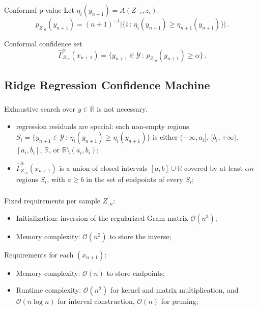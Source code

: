\documentclass[t]{beamer}  %
\newcommand{\Ycal}{\mathcal{Y}}
\newcommand{\Ocal}{\mathcal{O}}
\newcommand{\Real}{\mathbb{R}}
\begin{document}
\begin{frame}[t]\frametitle{\insertsection}
  \begin{block}{Conformal p-value}
    Let $\eta_i(y_{n+1}) = A(Z_{-i}, z_i)$.
    $$ p_{Z_{:n}}(y_{n+1})
          = (n+1)^{-1} \bigl\lvert\{ i \,:\, \eta_i(y_{n+1}) \geq \eta_{n+1}(y_{n+1}) \}\bigr\rvert
      \,. $$
  \end{block}

  \begin{block}{Conformal confidence set}
    $$ \hat{\Gamma}_{Z_{:n}}^\alpha(x_{n+1})
        = \bigl\{ y_{n+1}\in \Ycal \,:\, p_{Z_{:n}}(y_{n+1}) \geq \alpha \bigr\}
      \,. $$
  \end{block}
\end{frame}

\subsection{Ridge Regression Confidence Machine} %
\label{sub:ridge_regression_confidence_machine}

\begin{frame}[t]\frametitle{\insertsection}
  \framesubtitle{\insertsubsection}
  \begin{block}{Exhaustive search over $y\in \Real$ is not necessary.}
    \begin{itemize}
      \item regression residuals are special: each non-empty regions
      $S_i = \{y_{n+1}\in \Ycal \,:\, \eta_i(y_{n+1}) \geq \eta_i(y_{n+1})\}$
      is either $(-\infty, a_i]$, $[b_i, +\infty)$, $[a_i, b_i]$, $\Real$, or
      $\Real\setminus (a_i, b_i)$;
      \item $\hat{\Gamma}_{Z_{:n}}^\alpha(x_{n+1})$ is a union of closed intervals
        $[a, b]\cup\Real$ covered by at least $\alpha n$ regions $S_i$, with
        $a\geq b$ in the set of endpoints of every $S_i$;
    \end{itemize}
  \end{block}
\end{frame}

\begin{frame}[c]\frametitle{\insertsection}
\framesubtitle{\insertsubsection}
  Fixed requirements per sample $Z_{:n}$: \begin{itemize}
    \item Initialization: inversion of the regularized Gram matrix $\Ocal(n^3)$;
    \item Memory complexity: $\Ocal(n^2)$ to store the inverse;
  \end{itemize}

  Requirements for each $(x_{n+1})$:
  \begin{itemize}
    \item Memory complexity: $\Ocal(n)$ to store endpoints;
    \item Runtime complexity: $\Ocal(n^2)$ for kernel and matrix multiplication,
    and $\Ocal(n \log n)$ for interval construction, $\Ocal(n)$ for pruning;
  \end{itemize}
\end{frame}
\end{document}
